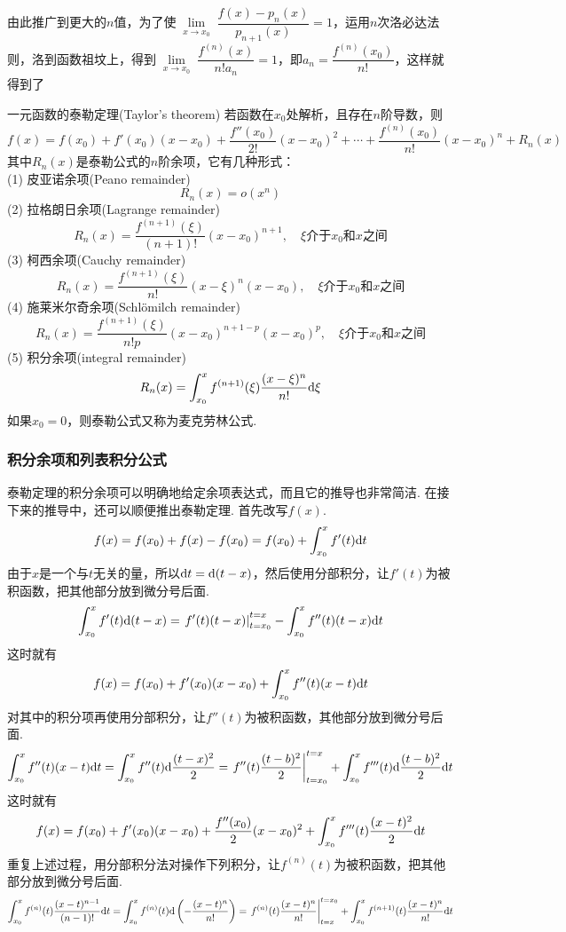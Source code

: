 \documentclass[main.tex]{subfiles}
\begin{document}
由此推广到更大的\(n\)值，为了使\(\lim \limits_{\substack{x\to x_0}}\dfrac{f(x)-p_n(x)}{p_{n+1}(x)}=1\)，运用\(n\)次洛必达法则，洛到函数祖坟上，得到\(\lim \limits_{\substack{x\to x_0}}\dfrac{f^{(n)}(x)}{n!a_n}=1\)，即\(a_n=\dfrac{f^{(n)}(x_0)}{n!}\)，这样就得到了

\begin{theorem}{一元函数的泰勒定理(Taylor's theorem)}
    若函数在\(x_0\)处解析，且存在\(n\)阶导数，则
    \[f(x) = f(x_0)+f'(x_0)(x-x_0)+\frac{f''(x_0)}{2!}(x-x_0)^2+\cdots+\frac{f^{(n)}(x_0)}{n!}(x-x_0)^n+R_n(x)\]
    其中\(R_n(x)\)是泰勒公式的\(n\)阶余项，它有几种形式：\\
    (1) 皮亚诺余项(Peano remainder)
    \[ R_n(x) = o(x^n) \]
    (2) 拉格朗日余项(Lagrange remainder)
    \[ R_n(x) = \frac{f^{(n+1)}(\xi)}{(n+1)!}(x-x_0)^{n+1}, \quad \xi\mbox{介于}x_0\mbox{和}x\mbox{之间}\]
    (3) 柯西余项(Cauchy remainder)
    \[ R_n(x) = \frac{f^{(n+1)}(\xi)}{n!}(x-\xi)^{n}(x-x_0), \quad \xi\mbox{介于}x_0\mbox{和}x\mbox{之间}\]
    (4) 施莱米尔奇余项(Schlömilch remainder)
    \[ R_n(x) = \frac{f^{(n+1)}(\xi)}{n!p}(x-x_0)^{n+1-p}(x-x_0)^p, \quad \xi\mbox{介于}x_0\mbox{和}x\mbox{之间}\]
    (5) 积分余项(integral remainder)
    \[ R_n(x) = \int_{x_0}^{x}f^{(n+1)}(\xi)\frac{(x-\xi)^{n}}{n!}{\rm d}{\xi} \]
    如果\(x_0=0\)，则泰勒公式又称为麦克劳林公式.
\end{theorem}

\subsubsection{积分余项和列表积分公式}

泰勒定理的积分余项可以明确地给定余项表达式，而且它的推导也非常简洁. 在接下来的推导中，还可以顺便推出泰勒定理. 首先改写\(f(x)\).
\[f(x)=f(x_0)+f(x)-f(x_0)=f(x_0)+\int_{x_0}^{x}f'(t){\rm d}t\]
由于\(x\)是一个与\(t\)无关的量，所以\({\rm d}t={\rm d}(t-x)\)，然后使用分部积分，让\(f'(t)\)为被积函数，把其他部分放到微分号后面.
\[\int_{x_0}^{x}f'(t){\rm d}(t-x) = \left.f'(t)(t-x)\right|_{t=x_0}^{t=x} - \int_{x_0}^{x}f''(t)(t-x){\rm d}t\]
这时就有
\[f(x) = f(x_0)+f'(x_0)(x-x_0)+\int_{x_0}^{x}f''(t)(x-t){\rm d}t\]
对其中的积分项再使用分部积分，让\(f''(t)\)为被积函数，其他部分放到微分号后面.
\[\int_{x_0}^{x}f''(t)(x-t){\rm d}t = \int_{x_0}^{x}f''(t){\rm d}\frac{(t-x)^2}{2} = \left.f''(t)\frac{(t-b)^2}{2}\right|_{t=x_0}^{t=x} + \int_{x_0}^{x}f'''(t){\rm d}\frac{(t-b)^2}{2}{\rm d}t\]
这时就有
\[f(x) = f(x_0)+f'(x_0)(x-x_0)+\frac{f''(x_0)}{2}(x-x_0)^2+\int_{x_0}^{x}f'''(t)\frac{(x-t)^2}{2}{\rm d}t\]
重复上述过程，用分部积分法对操作下列积分，让\(f^{(n)}(t)\)为被积函数，把其他部分放到微分号后面.
\[\int_{x_0}^{x}f^{(n)}(t)\frac{(x-t)^{n-1}}{(n-1)!}{\rm d}t = \int_{x_0}^{x}f^{(n)}(t){\rm d}\left(-\frac{(x-t)^n}{n!}\right) = \left.f^{(n)}(t)\frac{(x-t)^n}{n!}\right|_{t=x}^{t=x_0} + \int_{x_0}^{x}f^{(n+1)}(t)\frac{(x-t)^{n}}{n!}{\rm d}t\]
\end{document}
